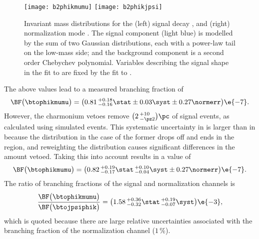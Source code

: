\begin{figure}
  \begin{center}
    \texttt{[image: b2phikmumu]}
    \texttt{[image: b2phikjpsi]}
    \caption[Fits to \btokphimumu and \btojpsiphik candidates]
    {
      Invariant mass distributions for the
      (left) signal decay \btophikmumu, and
      (right) normalization mode \btojpsiphik.
      The signal component (light blue) is modelled by the sum of two Gaussian distributions, each
      with a power-law tail on the low-mass side; and the background component is a second order
      Chebychev polynomial.
      Variables describing the signal shape in the fit to \btophikmumu are fixed by the fit to
      \btojpsiphik.
    }
    \label{fig:phik:fit}
  \end{center}
\end{figure}

The above values lead to a measured branching fraction of
\begin{equation}
  \BF\big(\btophikmumu\big)=
  \big(0.81\,^{+0.18}_{-0.16}\stat\pm0.03\syst\pm0.27\normerr\big)\e{-7}.
\end{equation}
However, the charmonium vetoes remove $\big(2\,^{+10}_{-\pz2}\big)\pc$ of signal events, as
calculated using simulated events.
This systematic uncertainty in \btophikmumu is larger than in \btokpipimumu because the \qsq
distribution in the case of the former drops off and ends in the \jpsi region, and reweighting the
\qsq distribution causes significant differences in the amount vetoed.
Taking this into account results in a value of
\begin{equation}
  \BF\big(\btophikmumu\big)=
  \big(0.82\,^{+0.19}_{-0.17}\stat\,^{+0.10}_{-0.04}\syst\pm0.27\normerr\big)\e{-7}.
\end{equation}
The ratio of branching fractions of the signal and normalization channels is
\begin{equation}
  \frac{ \BF\big(\btophikmumu\big) }{ \BF\big(\btojpsiphik\big) }
  =\big(1.58\,^{+0.36}_{-0.32}\stat\,^{+0.19}_{-0.07}\syst\big)\e{-3},
\end{equation}
which is quoted because there are large relative uncertainties associated with the branching
fraction of the normalization channel (\approx$1\,\%$).



